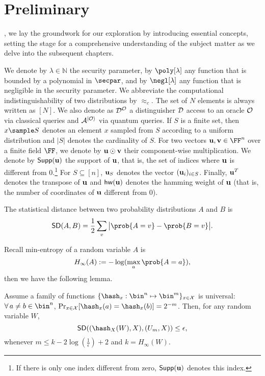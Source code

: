
\chapter{Preliminary}
\label{sec:prelim}
, we lay the groundwork for our exploration by introducing essential concepts, setting the stage for a comprehensive understanding of the subject matter as we delve into the subsequent chapters.

We denote by $\lambda \in\mathbb{N}$ the security parameter, by $\poly[\lambda]$ any function that is bounded by a polynomial in $\secpar$, and by $\negl[\lambda]$ any
function that is negligible in the security parameter. We abbreviate the computational indistinguishability of two distributions by $\approx_c$. The set of $N$ elements is always written as $[N]$. We also denote as $\mathcal{D}^{\mathcal{O}}$ a distinguisher $\mathcal{D}$ access to an oracle $\mathcal{O}$ via classical queries and $\mathcal{A}^{|\mathcal{O}\rangle}$ via quantum queries. 
If $S$ is a finite set, then  $x\sample S$  denotes an element $x$ sampled from $S$ according to a uniform distribution and $|S|$ denotes the cardinality of $S$.
For two vectors $\un,\vn\in\FF^n$ over a finite field $\FF$, we denote by $\mathbf{u}\odot \mathbf{v}$ their component-wise multiplication. We denote by $\mathsf{Supp}(\mathbf{u})$ the support of $\mathbf{u}$, that is, the set of indices where $\mathbf{u}$ is different from $0$.\footnote{If there is only one index different from zero, $\mathsf{Supp}(\mathbf{u})$ denotes this index.} For $S\subseteq [n]$, $\mathbf{u}_S$ denotes the vector $(\mathbf{u}_i)_{i\in S}$. Finally, $\mathbf{u}^T$ denotes the transpose of $\mathbf{u}$ and $\mathsf{hw}(\mathbf{u})$ denotes the hamming weight of $\mathbf{u}$ (that is, the number of coordinates of $\mathbf{u}$ different from $0$).


\begin{definition}
The statistical distance between two probability distributions $A$ and $B$ is 
$$\sd(A,B)=\frac{1}{2}\sum_v\big|\prob{A=v}-\prob{B=v}\big|.
$$
\end{definition}

Recall min-entropy of a random variable $A$ is 
$$H_\infty(A):=-\log(\max_a \prob{A=a}),$$
then we have the following lemma.
\begin{lemma}
Assume a family of functions $\{\hash_x:\bin^n\mapsto\bin^m\}_{x\in\Xc}$ is universal: $\forall\, a\ne b\in\bin^n$, $\Pr_{x\in\Xc}[\hash_x(a)=\hash_x(b)]=2^{-m}$. Then, for any random variable $W$,
$$\sd((\hash_X(W),X), (U_m,X))\le \epsilon,
$$
whenever $m\le k-2\log(\frac{1}{\epsilon})+2$ and $k=H_\infty(W).$
\end{lemma}


